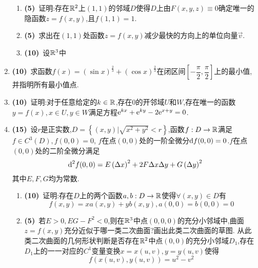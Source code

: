 \documentclass{ctexart}
\begin{document}
\begin{enumerate}[leftmargin=*,label=\textbf{\arabic*.}]
\begin{enumerate}[label=\textbf{(\arabic*)},leftmargin=*]
            \item \textbf{(5)}\ 证明:存在$\mathbb{R}^2$上$(1,1)$的邻域$D$使得$D$上由$F(x,y,z)\equiv0$确定唯一的隐函数$z=f(x,y)$,且$f(1,1)=1$.
            \item \textbf{(5)}\ 求出在$(1,1)$处函数$z=f(x,y)$减少最快的方向上的单位向量$\vec{v}$.
            \item \textbf{(10)}\ 设$\mathbb{R}^3$中
        \end{enumerate}
    \item \textbf{(10)}\ 求函数$f(x)=\left(\sin x\right)^{\frac{2}{3}}+\left(\cos x\right)^{\frac{2}{3}}$在闭区间$\left[-\dfrac{\pi}{2},\dfrac{\pi}{2}\right]$上的最小值,并指明所有最小值点.
    \item \textbf{(10)}\ 证明:对于任意给定的$k\in\mathbb{R}$,存在$0$的开邻域$U$和$W$,存在唯一的函数$y=f(x),x\in U,y\in W$满足方程$\mathrm{e}^{kx}+\mathrm{e}^{ky}-2\mathrm{e}^{x+y}=0$.
    \item \textbf{(15)}\ 设$r$是正实数,$D=\left\{(x,y)\vert\sqrt{x^2+y^2}<r\right\}$,函数$f:D\to\mathbb{R}$满足$f\in C^3(D),f(0,0)=0$,
        $f$在点$(0,0)$处的一阶全微分$\mathrm{d} f(0,0)=0$.$f$在点$(0,0)$处的二阶全微分满足
        $$\mathrm{d}^2f(0,0)=E\left(\Delta x\right)^2+2F\Delta x\Delta y+G\left(\Delta y\right)^2$$
        其中$E,F,G$均为常数.
        \begin{enumerate}[label=\textbf{(\arabic*)},leftmargin=*]
            \item \textbf{(10)}\ 证明:存在$D$上的两个函数$a,b:D\to\mathbb{R}$使得$\forall (x,y)\in D$有$$f(x,y)=xa(x,y)+yb(x,y),a(0,0)=b(0,0)=0$$
            \item \textbf{(5)}\ 若$E>0,EG-F^2<0$,则在$\mathbb{R}^3$中点$(0,0,0)$的充分小邻域中,曲面$z=f(x,y)$充分近似于哪一类二次曲面?画出此类二次曲面的草图.
                从此类二次曲面的几何形状判断是否存在$\mathbb{R}^2$中点$(0,0)$的充分小邻域$D_1$,存在$D_1$上的一一对应的$C^1$变量变换$x=x(u,v),y=y(u,v)$使得
                $$f(x(u,v),y(u,v))=u^2-v^2$$
        \end{enumerate}
\end{enumerate}
\end{document}
